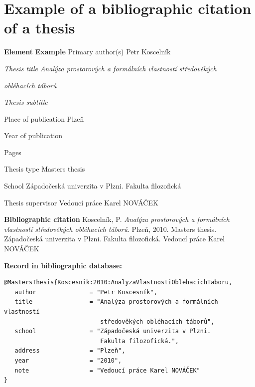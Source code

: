 \section*{Example of a bibliographic citation of a thesis}
\label{pr-akademicka-prace1}
\begin{tabbing} 
\zarazky
\textbf{Element} \> \textbf{Example} \odradkovani
Primary author(s) \>
Petr {\sc Koscelník}

\odradkovani
{\em Thesis title} \>
{\em Analýza prostorových a formálních vlastností středověkých}

    \odradkovani \>
    {\em obléhacích táborů}

\odradkovani
{\em Thesis subtitle}\footnotemark[1] \>

\odradkovani
Place of publication \>
Plzeň

\odradkovani
Year of publication 

\odradkovani
Pages\footnotemark[1] \>

\odradkovani
Thesis type \>
Masters thesis

\odradkovani
School \>
Západočeská univerzita v Plzni. Fakulta filozofická

\odradkovani
Thesis supervisor\footnotemark[1] \>
Vedoucí práce Karel NOVÁČEK

\odradkovani
\end{tabbing}

\noindent \textbf{Bibliographic citation} \odradkovani
{\sc Koscelník}, P. {\em Analýza prostorových a formálních vlastností středověkých obléhacích táborů}. Plzeň, 2010. Masters thesis. Západočeská univerzita v Plzni. Fakulta filozofická. Vedoucí práce Karel {\sc NOVÁČEK}

\bigskip \bigskip
\noindent \textbf{Record in bibliographic database:}
\vspace{-0.5em}
\begin{verbatim}
@MastersThesis{Koscesnik:2010:AnalyzaVlastnostiOblehacichTaboru,
   author               = "Petr Koscesník",
   title                = "Analýza prostorových a formálních vlastností 
                           středověkých obléhacích táborů",
   school               = "Západočeská univerzita v Plzni. 
                           Fakulta filozofická.",
   address              = "Plzeň",
   year                 = "2010",
   note                 = "Vedoucí práce Karel NOVÁČEK"
}
\end{verbatim}


